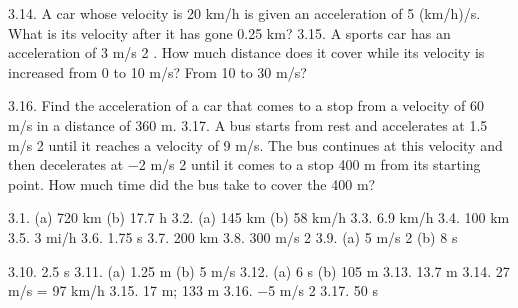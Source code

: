 3.14. A car whose velocity is 20 km/h is given an acceleration of 5 (km/h)/s. What is its velocity after it has gone 0.25 km?
3.15. A sports car has an acceleration of 3 m/s 2 . How much distance does it cover while its velocity is increased from 0 to
10 m/s? From 10 to 30 m/s?

3.16. Find the acceleration of a car that comes to a stop from a velocity of 60 m/s in a distance of 360 m.
3.17. A bus starts from rest and accelerates at 1.5 m/s 2 until it reaches a velocity of 9 m/s. The bus continues at this velocity
and then decelerates at −2 m/s 2 until it comes to a stop 400 m from its starting point. How much time did the bus
take to cover the 400 m?

3.1. (a) 720 km (b) 17.7 h
3.2. (a) 145 km (b) 58 km/h
3.3. 6.9 km/h
3.4. 100 km
3.5. 3 mi/h
3.6. 1.75 s
3.7. 200 km
3.8. 300 m/s 2
3.9. (a) 5 m/s 2 (b) 8 s
 
 3.10. 2.5 s
 3.11. (a) 1.25 m (b) 5 m/s
 3.12. (a) 6 s (b) 105 m
 3.13. 13.7 m
 3.14. 27 m/s = 97 km/h
 3.15. 17 m; 133 m
 3.16. −5 m/s 2
 3.17. 50 s




\endinput

